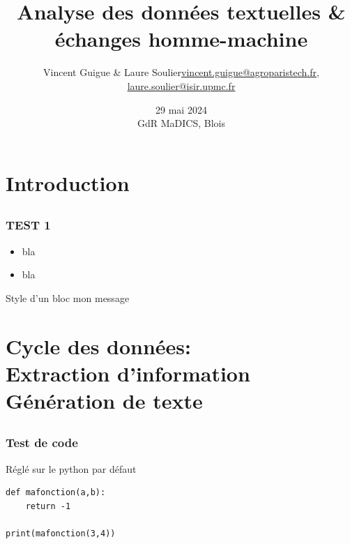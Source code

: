 \documentclass[12pt,xcolor=dvipsnames,aspectratio=1610]{beamer}
\title{ Analyse des données textuelles \& \newline échanges homme-machine}
\author{Vincent Guigue \& Laure Soulier\newline  \small \url{vincent.guigue@agroparistech.fr},  \small \url{laure.soulier@isir.upmc.fr}}%
\date{\normalsize 29 mai 2024\\ GdR MaDICS, Blois}
\begin{document}
\maketitle



\section{Introduction} 
\subsection{}

% 

\begin{frame}\frametitle{TEST 1}
  \begin{itemize}
  \item  bla
  \item bla
  \end{itemize}

  \begin{block}{Style d'un bloc}
    mon message
  \end{block}
\end{frame}

\section[Cycle]{Cycle des données:\\ Extraction d'information\\ Génération de texte}
\subsection{}

\begin{frame}[fragile]\frametitle{Test de code}

Réglé sur le python par défaut

\begin{lstlisting}
def mafonction(a,b):
    return -1

print(mafonction(3,4))
\end{lstlisting}

\end{frame}
\end{document}
